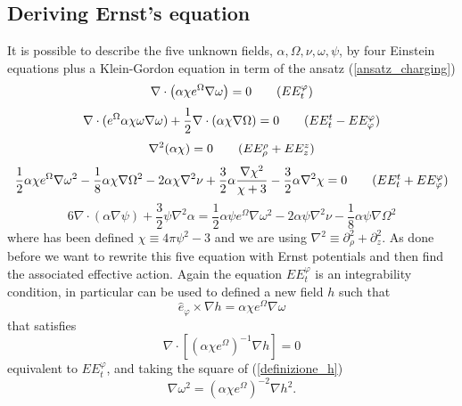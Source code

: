 \subsection{Deriving Ernst's equation}
It is possible to describe the five unknown fields, $\alpha,\Omega,\nu, \omega, \psi$, by four Einstein equations plus a Klein-Gordon equation in term of the ansatz (\ref{ansatz_charging})
\begin{equation}
        \nabla\cdot \left(\alpha \chi e^{\Omega}\nabla \omega \right) =0 \tag{$EE^{\varphi}_t$}
\end{equation}
\begin{equation}
    \nabla\cdot(e^{\Omega}\alpha\chi\omega\nabla\omega) + \frac{1}{2} \nabla\cdot(\alpha\chi\nabla\Omega) = 0 \tag{$EE^t_t- EE^{\varphi}_{\varphi}$}
\end{equation}
\begin{equation}
    \nabla^2(\alpha\chi)=0 \tag{$EE^{\rho}_{\rho}+EE^{z}_{z}$}
\end{equation}
\begin{equation}
    \frac{1}{2}\alpha\chi e^{\Omega}\nabla \omega^2 - \frac{1}{8}\alpha\chi\nabla\Omega^2 -2 \alpha\chi\nabla^2\nu + \frac{3}{2}\alpha\frac{\nabla\chi^2}{\chi + 3} - \frac{3}{2}\alpha \nabla^2\chi=0 \tag{$EE^t_t+ EE^{\varphi}_{\varphi}$}
\end{equation}
\begin{equation}
    6\nabla\cdot(\alpha\nabla\psi) + \frac{3}{2}\psi\nabla^2\alpha = \frac{1}{2}\alpha\psi e^{\Omega}\nabla \omega^2 -2\alpha\psi\nabla^2\nu-\frac{1}{8}\alpha\psi\nabla\Omega^2 \tag{K.G.}
\end{equation}
where has been defined $\chi \equiv 4\pi\psi^2 -3$ and we are using $\nabla^2 \equiv \partial_{\rho}^2 + \partial_z^2$. As done before we want to rewrite this five equation with Ernst potentials and then find the associated effective action. Again the equation $EE^{\varphi}_t$ is an integrability condition, in particular can be used to defined a new field $h$ such that
\begin{equation}
    \hat{e}_{\varphi} \times \nabla h = \alpha\chi e^{\Omega}\nabla\omega
    \label{definizione_h}
\end{equation}
that satisfies  
\begin{equation}
    \nabla\cdot\left[ (\alpha\chi e^{\Omega})^{-1}\nabla h \right] = 0
    \label{divergenza_h_charging}
\end{equation}
equivalent to $EE^{\varphi}_t$, and taking the square of (\ref{definizione_h})
\begin{equation}
    \nabla\omega^2 = (\alpha\chi e^{\Omega})^{-2}\nabla h^2.
    \label{h_due}
\end{equation}
